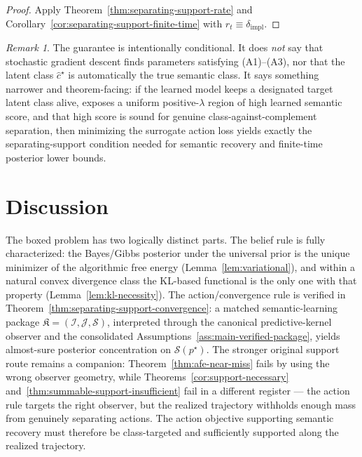 \documentclass[11pt]{article}
\theoremstyle{definition}
\theoremstyle{remark}
\newtheorem{remark}[theorem]{Remark}
\newcommand{\Scal}{\mathcal{S}}
\begin{document}
\begin{proof}
Apply Theorem~\ref{thm:separating-support-rate} and Corollary~\ref{cor:separating-support-finite-time} with $r_t\equiv \delta_{\mathrm{impl}}$.
\end{proof}

\begin{remark}
\label{rem:amortized-surrogate-scope}
The guarantee is intentionally conditional. It does \emph{not} say that stochastic gradient descent finds parameters satisfying \textup{(A1)--(A3)}, nor that the latent class $\hat c^\star$ is automatically the true semantic class. It says something narrower and theorem-facing: if the learned model keeps a designated target latent class alive, exposes a uniform positive-$\lambda$ region of high learned semantic score, and that high score is sound for genuine class-against-complement separation, then minimizing the surrogate action loss yields exactly the separating-support condition needed for semantic recovery and finite-time posterior lower bounds.
\end{remark}

\section{Discussion}
\label{sec:discussion}

The boxed problem has two logically distinct parts. The belief rule is fully characterized: the Bayes/Gibbs posterior under the universal prior is the unique minimizer of the algorithmic free energy (Lemma~\ref{lem:variational}), and within a natural convex divergence class the KL-based functional is the only one with that property (Lemma~\ref{lem:kl-necessity}). The action/convergence rule is verified in Theorem~\ref{thm:separating-support-convergence}: a matched semantic-learning package $\mathfrak K=(\mathcal I,\mathcal J,\Scal)$, interpreted through the canonical predictive-kernel observer and the consolidated Assumptions~\ref{ass:main-verified-package}, yields almost-sure posterior concentration on $\Scal(p^\star)$. The stronger original support route remains a companion: Theorem~\ref{thm:afe-near-miss} fails by using the wrong observer geometry, while Theorems~\ref{cor:support-necessary} and~\ref{thm:summable-support-insufficient} fail in a different register --- the action rule targets the right observer, but the realized trajectory withholds enough mass from genuinely separating actions. The action objective supporting semantic recovery must therefore be class-targeted and sufficiently supported along the realized trajectory.
\end{document}
